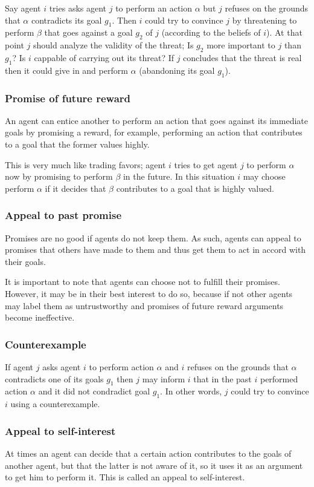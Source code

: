 \documentclass{article}
\begin{document}
Say agent $i$ tries asks agent $j$ to perform an action $\alpha$ but $j$ refuses on the grounds that $\alpha$ contradicts its goal $g_1$. Then $i$ could try to convince $j$ by threatening to perform $\beta$ that goes against a goal $g_2$ of $j$ (according to the beliefs of $i$). At that point $j$ should analyze the validity of the threat; Is $g_2$ more important to $j$ than $g_1$? Is $i$ cappable of carrying out its threat? If $j$ concludes that the threat is real then it could give in and perform $\alpha$ (abandoning its goal $g_1$).

\subsubsection{Promise of future reward}
An agent can entice another to perform an action that goes against its immediate goals by promising a reward, for example, performing an action that contributes to a goal that the former values highly. 

This is very much like trading favors; agent $i$ tries to get agent $j$ to perform $\alpha$ now by promising to perform $\beta$ in the future. In this situation $i$ may choose perform $\alpha$ if it decides that $\beta$ contributes to a goal that is highly valued.

\subsubsection{Appeal to past promise}
Promises are no good if agents do not keep them. As such, agents can appeal to promises that others have made to them and thus get them to act in accord with their goals.

It is important to note that agents can choose not to fulfill their promises. However, it may be in their best interest to do so, because if not other agents may label them as untrustworthy and promises of future reward arguments become ineffective.

\subsubsection{Counterexample}
If agent $j$ asks agent $i$ to perform action $\alpha$ and $i$ refuses on the grounds that $\alpha$ contradicts one of its goals $g_1$ then $j$ may inform $i$ that in the past $i$  performed action $\alpha$ and it did not condradict goal $g_1$. In other words, $j$ could try to convince $i$ using a counterexample.

\subsubsection{Appeal to self-interest}
At times an agent can decide that a certain action contributes to the goals of another agent, but that the latter is not aware of it, so it uses it as an argument to get him to perform it. This is called an appeal to self-interest.
\end{document}
